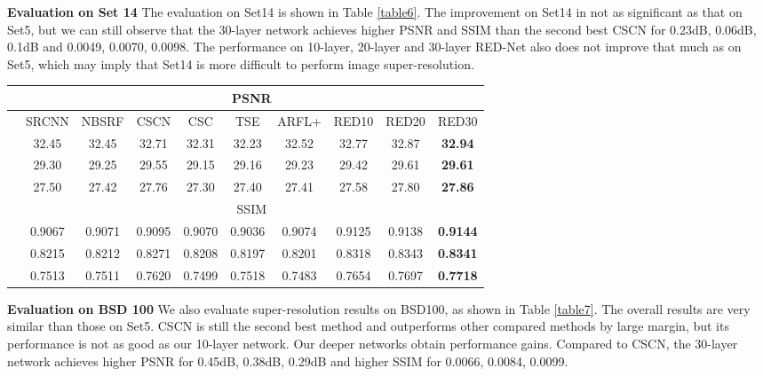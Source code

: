 \documentclass[10pt,journal,compsoc]{IEEEtran}
\begin{document}
{\bf{Evaluation on Set 14}} The evaluation on Set14 is shown in Table \ref{table6}.
The improvement on Set14 in not as significant as that on Set5, but we can still
observe that the 30-layer network achieves higher PSNR and SSIM than the second
best CSCN for 0.23dB, 0.06dB, 0.1dB and 0.0049, 0.0070, 0.0098. The performance
on 10-layer, 20-layer and 30-layer RED-Net also does not improve that much as on
Set5, which may imply that Set14 is more difficult to perform image super-resolution.

\begin{table*}[htb!]
\centering
\caption{Average PSNR and SSIM results of scaling 2, 3 and 4 on Set14.}
\begin{tabular}{c|c c c c c c c c c}  \hline
              &\multicolumn{9}{c}{PSNR}            \\ \hline
           &SRCNN  &NBSRF  &CSCN   &CSC    &TSE    &ARFL+   &RED10    &RED20   &RED30           \\ \hline
    &32.45  &32.45  &32.71  &32.31  &32.23  &32.52   &32.77    &32.87   &\textbf{32.94}  \\ \hline
    &29.30  &29.25  &29.55  &29.15  &29.16  &29.23   &29.42    &29.61   &\textbf{29.61}  \\ \hline
    &27.50  &27.42  &27.76  &27.30  &27.40  &27.41   &27.58    &27.80   &\textbf{27.86}  \\ \hline
              &\multicolumn{9}{c}{SSIM}            \\ \hline
    &0.9067 &0.9071 &0.9095 &0.9070 &0.9036 &0.9074 &0.9125    &0.9138  &\textbf{0.9144} \\ \hline
    &0.8215 &0.8212 &0.8271 &0.8208 &0.8197 &0.8201 &0.8318    &0.8343  &\textbf{0.8341} \\ \hline
    &0.7513 &0.7511 &0.7620 &0.7499 &0.7518 &0.7483 &0.7654    &0.7697  &\textbf{0.7718} \\ \hline
\end{tabular}
\label{table6}
\end{table*}

{\bf{Evaluation on BSD 100}} We also evaluate super-resolution results on BSD100,
as shown in Table \ref{table7}. The overall results are very similar than those on Set5.
CSCN is still the second best method and outperforms other compared methods by large
margin, but its performance is not as good as our 10-layer network. Our deeper networks
obtain performance gains. Compared to CSCN, the 30-layer network achieves higher
PSNR for 0.45dB, 0.38dB, 0.29dB and higher SSIM for 0.0066, 0.0084, 0.0099.
\end{document}
